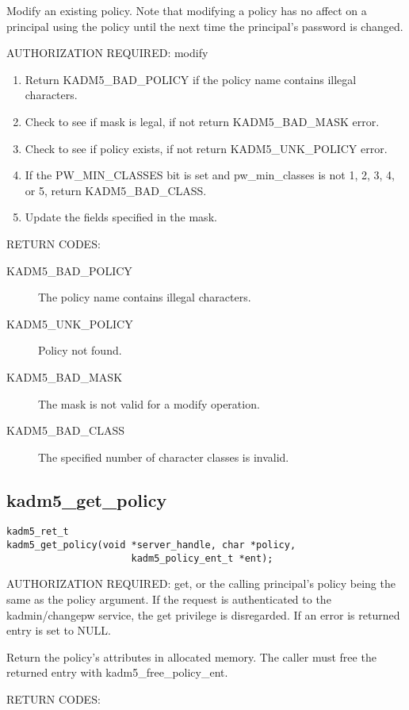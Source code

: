 Modify an existing policy.  Note that modifying a policy has no affect
on a principal using the policy until the next time the principal's
password is changed.

AUTHORIZATION REQUIRED: modify

\begin{enumerate}
\item Return KADM5_BAD_POLICY if the policy name contains illegal
characters.
\item Check to see if mask is legal, if not return KADM5_BAD_MASK error.
\item Check to see if policy exists, if not return
KADM5_UNK_POLICY error.
\item If the PW_MIN_CLASSES bit is set and pw_min_classes is not 1, 2,
3, 4, or 5, return KADM5_BAD_CLASS.
\item Update the fields specified in the mask.
\end{enumerate}

RETURN CODES: 

\begin{description}
\item[KADM5_BAD_POLICY] The policy name contains illegal characters.
\item[KADM5_UNK_POLICY] Policy not found.
\item[KADM5_BAD_MASK] The mask is not valid for a modify
operation.
\item[KADM5_BAD_CLASS] The specified number of character classes
is invalid.
\end{description}

\subsection{kadm5_get_policy}

\begin{verbatim}
kadm5_ret_t
kadm5_get_policy(void *server_handle, char *policy,
                      kadm5_policy_ent_t *ent); 
\end{verbatim}

AUTHORIZATION REQUIRED: get, or the calling principal's policy being
the same as the policy argument.  If the request is authenticated to
the kadmin/changepw service, the get privilege is disregarded.
If an error is returned entry is set to NULL.

Return the policy's attributes in allocated memory.  The caller must
free the returned entry with kadm5_free_policy_ent.

RETURN CODES: 

